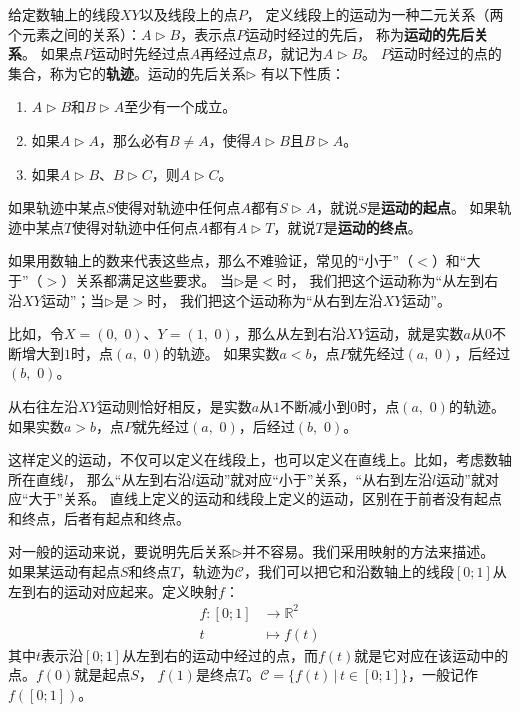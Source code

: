 \documentclass[12pt,UTF8,fontset=none]{ctexbook}
\begin{document}
给定数轴上的线段$XY$以及线段上的点$P$，
定义线段上的运动为一种二元关系（两个元素之间的关系）：$A \triangleright B$，表示点$P$运动时经过的先后，
称为\textbf{运动的先后关系}。
如果点$P$运动时先经过点$A$再经过点$B$，就记为$A \triangleright B$。
$P$运动时经过的点的集合，称为它的\textbf{轨迹}。运动的先后关系$\triangleright$
有以下性质：
\begin{enumerate}
    \item $A \triangleright B$和$B \triangleright A$至少有一个成立。
    \item 如果$A \triangleright A$，那么必有$B\neq A$，使得$A \triangleright B$且$B \triangleright A$。
    \item 如果$A \triangleright B$、$B \triangleright C$，则$A \triangleright C$。
\end{enumerate}
如果轨迹中某点$S$使得对轨迹中任何点$A$都有$S \triangleright A$，就说$S$是\textbf{运动的起点}。
如果轨迹中某点$T$使得对轨迹中任何点$A$都有$A \triangleright T$，就说$T$是\textbf{运动的终点}。

如果用数轴上的数来代表这些点，那么不难验证，常见的“小于”（$<$）和“大于”（$>$）关系都满足这些要求。
当$\triangleright$是$<$时，
我们把这个运动称为“从左到右沿$XY$运动”；当$\triangleright$是$>$时，
我们把这个运动称为“从右到左沿$XY$运动”。

比如，令$X = (0,\,\,0)$、$Y = (1,\,\,0)$，那么从左到右沿$XY$运动，就是实数$a$从$0$不断增大到$1$时，点$(a,\,\,0)$的轨迹。
如果实数$a<b$，点$P$就先经过$(a,\,\,0)$，后经过$(b,\,\,0)$。

从右往左沿$XY$运动则恰好相反，是实数$a$从$1$不断减小到$0$时，点$(a,\,\,0)$的轨迹。
如果实数$a>b$，点$P$就先经过$(a,\,\,0)$，后经过$(b,\,\,0)$。

这样定义的运动，不仅可以定义在线段上，也可以定义在直线上。比如，考虑数轴所在直线$l$，
那么“从左到右沿$l$运动”就对应“小于”关系，“从右到左沿$l$运动”就对应“大于”关系。
直线上定义的运动和线段上定义的运动，区别在于前者没有起点和终点，后者有起点和终点。

对一般的运动来说，要说明先后关系$\triangleright$并不容易。我们采用映射的方法来描述。
如果某运动有起点$S$和终点$T$，轨迹为$\mathcal{C}$，我们可以把它和沿数轴上的线段$[0;1]$从左到右的运动对应起来。定义映射$f$：
\begin{align*}
    f: [0;1] &\rightarrow \mathbb{R}^2  \\
         t \,\,\, &\mapsto f(t) 
\end{align*}
其中$t$表示沿$[0;1]$从左到右的运动中经过的点，而$f(t)$就是它对应在该运动中的点。$f(0)$就是起点$S$，
$f(1)$是终点$T$。$\mathcal{C} = \{f(t)\,|\,t\in[0;1]\}$，一般记作$f([0;1])$。
\end{document}
